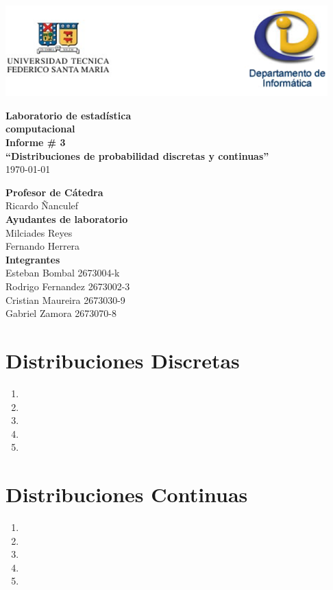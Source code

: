 \documentclass[letterpaper,spanish,11pt]{article}
\begin{document}
\begin{titlepage}
\begin{center}
\includegraphics[height=3.5cm]{images/logo_latex}
\end{center}
\vspace{1.5cm}
\begin{center}
\textbf{\Huge{Laboratorio de estad\'istica}}\\[0.2cm]
\textbf{\Huge{computacional}}\\[0.7cm]
\textbf{\huge{Informe \# 3}}\\[0.7cm]
\textbf{\huge{``Distribuciones de probabilidad discretas y continuas''}}\\[0.3cm] 
\today\\[1.5cm]
\end{center}
\vspace{2cm}
\begin{flushright}
\large{\textbf{Profesor de C\'atedra}} \\
\large{Ricardo \~{N}anculef} \\[0.5cm]
\large{\textbf{Ayudantes de laboratorio}}\\
\large{Milciades Reyes}\\
\large{Fernando Herrera}\\[0.5cm]
\large{\textbf{Integrantes}} \\
\large{Esteban Bombal 2673004-k} \\
\large{Rodrigo Fernandez 2673002-3} \\
\large{Cristian Maureira 2673030-9} \\
\large{Gabriel Zamora 2673070-8} \\
\end{flushright}
\end{titlepage}

\section{Distribuciones Discretas}

\begin{enumerate}
\item 
\item 
\item 
\item 
\item 
\end{enumerate}

\section{Distribuciones Continuas}

\begin{enumerate}
\item 
\item 
\item 
\item 
\item 
\end{enumerate}
\end{document}
